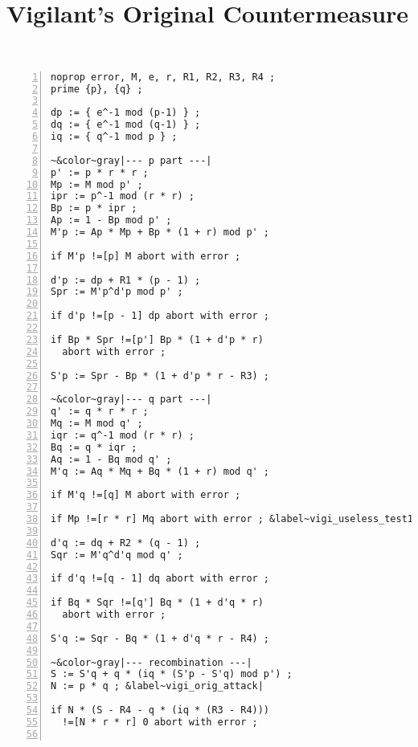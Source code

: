 \documentclass[10pt]{article}
\theoremstyle{definition}
\theoremstyle{theorem}
\begin{document}
\begin{minipage}[c]{\textwidth} \begin{minipage}[c]{0.42\textwidth} 

\section{Vigilant's Original Countermeasure}
\label{app-vigilant-orig}

\begin{minipage}[c]{\linewidth}
\begin{minipage}[c]{0.1\linewidth}
~
\end{minipage}
\begin{minipage}[c]{0.85\linewidth}
{\smaller
\begin{Verbatim}[commandchars=&~|,numbers=left]
noprop error, M, e, r, R1, R2, R3, R4 ;
prime {p}, {q} ;

dp := { e^-1 mod (p-1) } ;
dq := { e^-1 mod (q-1) } ;
iq := { q^-1 mod p } ;

~&color~gray|--- p part ---|
p' := p * r * r ;
Mp := M mod p' ;
ipr := p^-1 mod (r * r) ;
Bp := p * ipr ;
Ap := 1 - Bp mod p' ;
M'p := Ap * Mp + Bp * (1 + r) mod p' ;

if M'p !=[p] M abort with error ;

d'p := dp + R1 * (p - 1) ;
Spr := M'p^d'p mod p' ;

if d'p !=[p - 1] dp abort with error ;

if Bp * Spr !=[p'] Bp * (1 + d'p * r)
  abort with error ;

S'p := Spr - Bp * (1 + d'p * r - R3) ;

~&color~gray|--- q part ---|
q' := q * r * r ;
Mq := M mod q' ;
iqr := q^-1 mod (r * r) ;
Bq := q * iqr ;
Aq := 1 - Bq mod q' ;
M'q := Aq * Mq + Bq * (1 + r) mod q' ;

if M'q !=[q] M abort with error ;

if Mp !=[r * r] Mq abort with error ; &label~vigi_useless_test1|

d'q := dq + R2 * (q - 1) ;
Sqr := M'q^d'q mod q' ;

if d'q !=[q - 1] dq abort with error ;

if Bq * Sqr !=[q'] Bq * (1 + d'q * r)
  abort with error ;

S'q := Sqr - Bq * (1 + d'q * r - R4) ;

~&color~gray|--- recombination ---|
S := S'q + q * (iq * (S'p - S'q) mod p') ;
N := p * q ; &label~vigi_orig_attack|

if N * (S - R4 - q * (iq * (R3 - R4)))
  !=[N * r * r] 0 abort with error ;


\end{Verbatim}}
\end{minipage}
\end{minipage}
\end{minipage}
\end{minipage}
\end{document}
